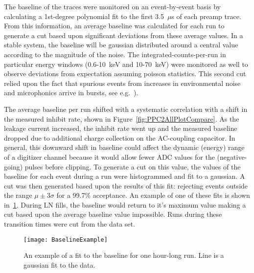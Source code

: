 	The baseline of the traces were monitored on an event-by-event basis by calculating a 1st-degree polynomial fit to the first 3.5~$\mu$s of each preamp trace.  From this information, an average baseline was calculated for each run to generate a cut based upon significant deviations from these average values.  In a stable system, the baseline will be gaussian distributed around a central value according to the magnitude of the noise.  The integrated-counts-per-run in particular energy windows (0.6-10~keV and 10-70~keV) were monitored as well to observe deviations from expectation assuming poisson statistics.  This second cut relied upon the fact that spurious events from increases in environmental noise and microphonics arrive in bursts, see e.g.~\cite{Morales1992410}).  
	
	The average baseline per run shifted with a systematic correlation with a shift in the measured inhibit rate, shown in Figure~\ref{fig:PPC2AllPlotCompare}.  As the leakage current increased, the inhibit rate went up and the measured baseline dropped due to additional charge collection on the AC-coupling capacitor.  In general, this downward shift in baseline could affect the dynamic (energy) range of a digitizer channel because it would allow fewer ADC values for the (negative-going) pulses before clipping.  To generate a cut on this value, the values of the baseline for each event during a run were histogrammed and fit to a gaussian.  A cut was then generated based upon the results of this fit: rejecting events outside the range $\mu\pm3\sigma$ for a 99.7\% acceptance.  An example of one of these fits is shown in~\ref{fig:PPC2BaselineCuts}.  During LN fills, the baseline would return to it's maximum value making a cut based upon the average baseline value impossible.  Runs during these transition times were cut from the data set.  
		
						
				\begin{figure}
					\centering
					\texttt{[image: BaselineExample]}
					\caption[An example of a fit to the baseline for one hour-long run]
					{An example of a fit to the baseline for one hour-long run.  Line is a gaussian fit to the data.}
					\label{fig:PPC2BaselineCuts}
				\end{figure}

